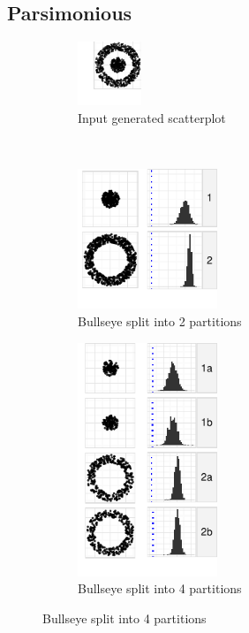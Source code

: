 \subsection{Parsimonious}
  \begin{figure}[t]
    \centering
    \begin{minipage}[b]{1.7in}
       \begin{subfigure}[b]{\linewidth}
  	\includegraphics[width=0.75in]{images/donut1-donut2.pdf}
      \caption{Input generated scatterplot}
      \label{fig:pars1}
      \end{subfigure}\\[\baselineskip]
      \begin{subfigure}[b]{\linewidth}
  	\includegraphics[width=1.65in]{images/19_5065416601259-cluster.pdf}
      \caption{Bullseye split into 2 partitions}
      \label{fig:pars2}
      \end{subfigure}
      \begin{subfigure}[b]{\linewidth}
  	\includegraphics[width=1.65in]{images/9_27395081160431-cluster1.pdf}
        \caption{Bullseye split into 4 partitions}
      \label{fig:pars3}        
      \end{subfigure}
    \end{minipage}

\end{figure}
